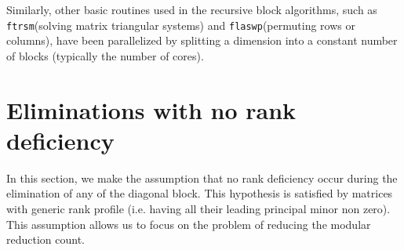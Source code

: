 \documentclass{article}
\newcommand{\ftrsm}{\texttt{ftrsm}\xspace}
\newcommand{\flaswp}{\texttt{flaswp}\xspace}
\begin{document}
 
 
 
 
 
 
 
 
 
 

Similarly, other basic routines used in the recursive block algorithms, such as
\ftrsm (solving matrix triangular systems) and \flaswp (permuting rows or
columns), have been parallelized by splitting a dimension into a constant number
of blocks (typically the number of cores).

\section{Eliminations with no rank deficiency}
\label{sec:fullrank}

In this section, we make the assumption that no rank deficiency occur during the
elimination of any of the diagonal block. This hypothesis is satisfied by
matrices with generic rank profile (i.e. having all their leading principal
minor non zero). This assumption allows us to focus on the problem of reducing
the modular reduction count.

 
 
 
 
 
 
 
 
 
 
 
 

 
 
 
 
 
 
 
 
 
 
 
 
 
 
 
 
    
 
 
 
 
 
 
 
 

 
 
 
 
 
 

 
 
 
 
 
 
 
 
 
 
 

 

 
 
 
 
 
\end{document}
